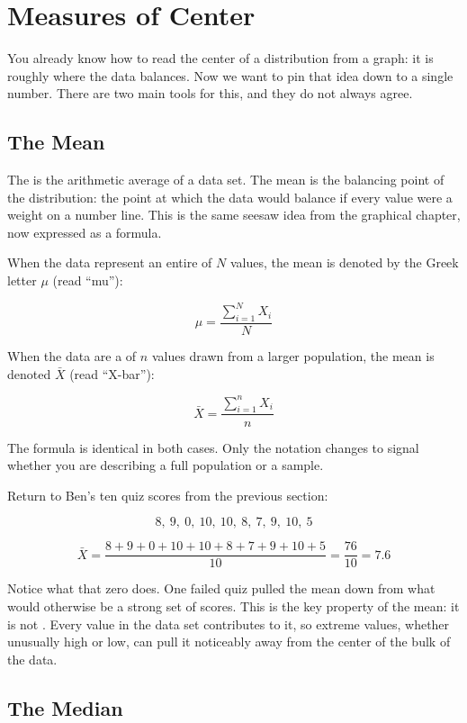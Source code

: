 \section{Measures of Center}

You already know how to read the center of a distribution from a graph:
it is roughly where the data balances. Now we want to pin that idea down
to a single number. There are two main tools for this, and they do not
always agree.

\subsection{The Mean}

The  is the arithmetic average of a data set.
The mean is the balancing point of the distribution: the point at
which the data would balance if every value were a weight on a
number line. This is the same seesaw idea from the graphical chapter,
now expressed as a formula. 

When the data represent an entire 
of $N$ values, the mean is denoted by the Greek letter $\mu$ (read
``mu''):

\[
\mu = \frac{\displaystyle\sum_{i=1}^{N} X_i}{N}
\]

When the data are a  of $n$ values drawn
from a larger population, the mean is denoted $\bar{X}$ (read
``X-bar''):

\[
\bar{X} = \frac{\displaystyle\sum_{i=1}^{n} X_i}{n}
\]

The formula is identical in both cases. Only the notation changes to
signal whether you are describing a full population or a sample.

Return to Ben's ten quiz scores from the previous section:

\[ 8,\ 9,\ 0,\ 10,\ 10,\ 8,\ 7,\ 9,\ 10,\ 5 \]

\[
\bar{X} = \frac{8 + 9 + 0 + 10 + 10 + 8 + 7 + 9 + 10 + 5}{10}
= \frac{76}{10} = 7.6
\]

Notice what that zero does. One failed quiz pulled the mean down from
what would otherwise be a strong set of scores. This is the key
property of the mean: it is not . Every value in the data set contributes to it, so extreme
values, whether unusually high or low, can pull it noticeably away
from the center of the bulk of the data.

\subsection{The Median}

